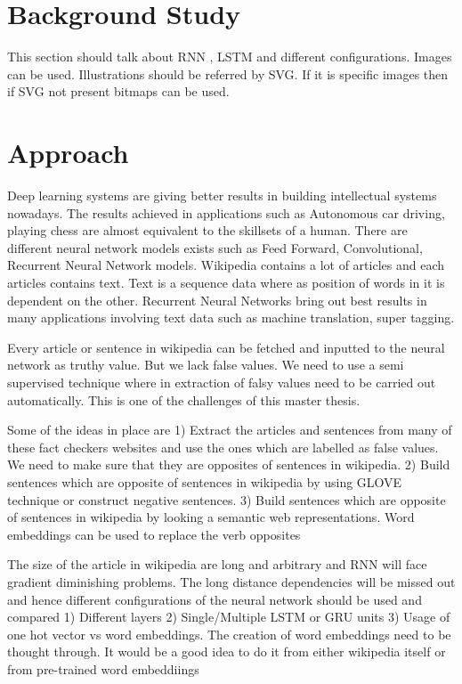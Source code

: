 \documentclass[a4paper, 11pt]{article}
\begin{document}
\color{red}
\section{Background Study}
This section should talk about RNN , LSTM and different configurations. 
Images can be used. Illustrations should be referred by SVG. If it is specific images then if SVG not present bitmaps can be used.
\color{black}
\section{Approach}

Deep learning systems are giving better results in building intellectual systems nowadays.\cite{Goldberg2016} The results achieved in applications such as Autonomous car driving, playing chess are almost equivalent to the skillsets of a human. There are different neural network models exists such as Feed Forward, Convolutional, Recurrent Neural Network models. Wikipedia contains a lot of articles and each articles contains text. Text is a sequence data where as position of words in it is dependent on the other. Recurrent Neural Networks bring out best results in many applications involving text data such as machine translation, super tagging.

Every article or sentence in wikipedia can be fetched and inputted to the neural network as truthy value. But we lack false values. We need to use a semi supervised technique where in extraction of falsy values need to be carried out automatically. This is one of the challenges of this master thesis. 

Some of the ideas in place are
1) Extract the articles and sentences from many of these fact checkers websites and use the ones which are labelled as false values. We need to make sure that they are opposites of sentences in wikipedia.
2) Build sentences which are opposite of sentences in wikipedia by using GLOVE technique or construct negative sentences. 
3) Build sentences which are opposite of sentences in wikipedia by looking a semantic web representations. Word embeddings can be used to replace the verb opposites 

The size of the article in wikipedia are long and arbitrary and RNN will face gradient diminishing problems. The long distance dependencies will be missed out and hence different configurations of the neural network should be used and compared 
1) Different layers
2) Single/Multiple LSTM or GRU units
3) Usage of one hot vector vs word embeddings. The creation of word embeddings need to be thought through. It would be a good idea to do it from either wikipedia itself or from pre-trained word embeddiings
\end{document}
